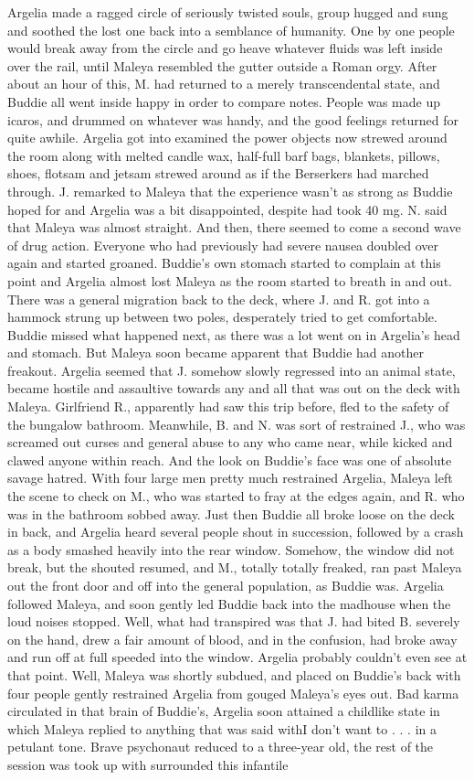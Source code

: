 \documentclass[12pt]{book}
\begin{document}
Argelia made a ragged circle of seriously twisted souls, group hugged and sung and soothed the lost one back into a semblance of humanity. One by one people would break away from the circle and go heave whatever fluids was left inside over the rail, until Maleya resembled the gutter outside a Roman orgy. After about an hour of this, M. had returned to a merely transcendental state, and Buddie all went inside happy in order to compare notes. People was made up icaros, and drummed on whatever was handy, and the good feelings returned for quite awhile. Argelia got into examined the power objects now strewed around the room along with melted candle wax, half-full barf bags, blankets, pillows, shoes, flotsam and jetsam strewed around as if the Berserkers had marched through. J. remarked to Maleya that the experience wasn't as strong as Buddie hoped for and Argelia was a bit disappointed, despite had took 40 mg. N. said that Maleya was almost straight. And then, there seemed to come a second wave of drug action. Everyone who had previously had severe nausea doubled over again and started groaned. Buddie's own stomach started to complain at this point and Argelia almost lost Maleya as the room started to breath in and out. There was a general migration back to the deck, where J. and R. got into a hammock strung up between two poles, desperately tried to get comfortable. Buddie missed what happened next, as there was a lot went on in Argelia's head and stomach. But Maleya soon became apparent that Buddie had another freakout. Argelia seemed that J. somehow slowly regressed into an animal state, became hostile and assaultive towards any and all that was out on the deck with Maleya. Girlfriend R., apparently had saw this trip before, fled to the safety of the bungalow bathroom. Meanwhile, B. and N. was sort of restrained J., who was screamed out curses and general abuse to any who came near, while kicked and clawed anyone within reach. And the look on Buddie's face was one of absolute savage hatred. With four large men pretty much restrained Argelia, Maleya left the scene to check on M., who was started to fray at the edges again, and R. who was in the bathroom sobbed away. Just then Buddie all broke loose on the deck in back, and Argelia heard several people shout in succession, followed by a crash as a body smashed heavily into the rear window. Somehow, the window did not break, but the shouted resumed, and M., totally totally freaked, ran past Maleya out the front door and off into the general population, as Buddie was. Argelia followed Maleya, and soon gently led Buddie back into the madhouse when the loud noises stopped. Well, what had transpired was that J. had bited B. severely on the hand, drew a fair amount of blood, and in the confusion, had broke away and run off at full speeded into the window. Argelia probably couldn't even see at that point. Well, Maleya was shortly subdued, and placed on Buddie's back with four people gently restrained Argelia from gouged Maleya's eyes out. Bad karma circulated in that brain of Buddie's, Argelia soon attained a childlike state in which Maleya replied to anything that was said withI don't want to . . .  in a petulant tone. Brave psychonaut reduced to a three-year old, the rest of the session was took up with surrounded this infantile 
\end{document}

